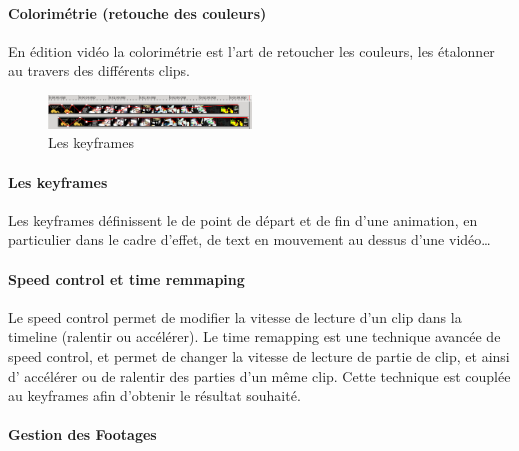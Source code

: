\paragraph{Colorimétrie (retouche des couleurs)}

En édition vidéo la colorimétrie est l'art de retoucher les couleurs,
les étalonner au travers des différents clips.

\begin{figure}

   \vspace{-20pt}

    \begin{center}

      \includegraphics[width=0.48\textwidth]{images/keyframecurves}

    \end{center}

   \vspace{-30pt} \caption{Les keyframes} \vspace{-10pt} \label{Yes}

\end{figure}

\paragraph{Les keyframes}

Les keyframes définissent le de point de départ et de fin d'une
animation, en particulier dans le cadre d'effet, de text en mouvement
au dessus d'une vidéo\ldots

\paragraph{Speed control et time remmaping}

Le speed control permet de modifier la vitesse de lecture d'un clip
dans la timeline (ralentir ou accélérer). Le time remapping est une
technique avancée de speed control, et permet de changer la vitesse de
lecture de partie de clip, et ainsi d' accélérer ou de ralentir des
parties d'un même clip. Cette technique est couplée au keyframes afin
d'obtenir le résultat souhaité.

\paragraph{Gestion des Footages}

